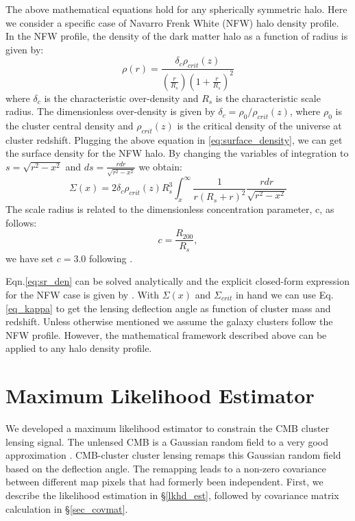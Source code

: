  The above mathematical equations hold for any spherically symmetric halo. 
 Here we consider a specific case of Navarro Frenk White (NFW) halo density profile.
 In the NFW profile, the density of the dark matter halo as a function of radius is given by:
 \begin{equation}
 \rho(r)= \frac{\delta_{c}\rho_{crit}(z)}{(\frac{r}{R_{s}})(1+\frac{r}{R_{s}})^{2}}
 \end{equation}
 where $\delta_{c}$ is the characteristic over-density and $R_{s}$ is the characteristic scale radius. %
 The dimensionless over-density is given by $\delta_{c} = \rho_{0}/\rho_{crit}(z)$, where $\rho_{0}$ is the cluster central density and  $\rho_{crit}(z)$  is the critical density of the universe at cluster redshift.
 Plugging the above equation in \ref{eq:surface_density}, we can get the surface density for the NFW halo. 
 By changing the variables of integration to $s=\sqrt{r^{2} - x^{2}}$ and $ds = \frac{rdr}{\sqrt{r^{2} - x^{2}}}$ we obtain:
 \begin{equation}
 \Sigma(x) = 2\delta_{c} \rho_{crit}(z) R^{3}_{s} \int^{\infty}_{x} \frac{1}{r(R_{s} + r)^{2}} \frac{rdr}{\sqrt{r^{2} - x^{2}}}
 \label{eq:sr_den}
 \end{equation}
 The scale radius is related to the dimensionless concentration parameter, c, as follows:
 \begin{equation}
 c = \frac{R_{200}}{R_{s}},
 \end{equation}
we have set $c = 3.0$ following \cite{bhattacharya13}.
 
 
 Eqn.\ref{eq:sr_den} can be solved analytically and the explicit closed-form expression for the NFW case is given by \cite{bartelmann96}. 
 With $\Sigma(x)$ and $\Sigma_{crit}$ in hand we can use Eq. \ref{eq_kappa} to get the lensing deflection angle as function of cluster mass and redshift. 
 Unless otherwise mentioned we assume the galaxy clusters follow the NFW profile. However,  the mathematical framework described above can be applied to any halo density profile. 


\section{Maximum Likelihood Estimator}
\label{sec_MLE}
We developed a maximum likelihood estimator to constrain the CMB cluster lensing signal.
 The unlensed CMB is a Gaussian random field to a very good approximation  \citep{planck14d}.
 CMB-cluster cluster lensing remaps this Gaussian random field based on the deflection angle.
 The remapping leads to a non-zero covariance between different map pixels that had formerly been independent. %
 First, we describe the likelihood estimation in \S\ref{lkhd_est}, followed by covariance matrix calculation in \S\ref{sec_covmat}.

